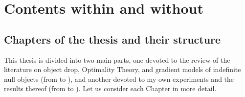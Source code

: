 
\section{Contents within and without} 

\subsection{Chapters of the thesis and their structure}
This thesis is divided into two main parts, one devoted to the review of the literature on object drop, Optimality Theory, and gradient models of indefinite null objects (from  to ), and another devoted to my own experiments and the results thereof (from  to ). Let us consider each Chapter in more detail.

